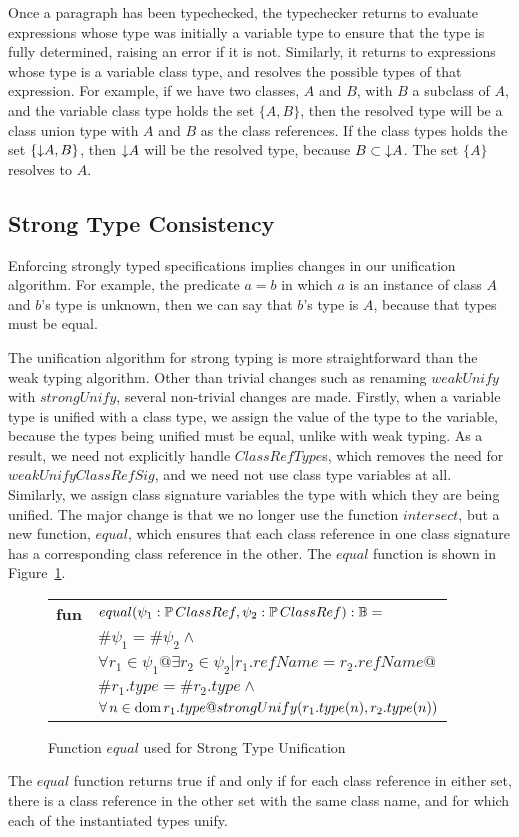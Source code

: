 Once a paragraph has been typechecked, the typechecker returns to
evaluate expressions whose type was initially a variable type to
ensure that the type is fully determined, raising an error if it is
not. Similarly, it returns to expressions whose type is a variable
class type, and resolves the possible types of that expression. For
example, if we have two classes, $A$ and $B$, with $B$ a subclass of
$A$, and the variable class type holds the set $\{A, B\}$, then the
resolved type will be a class union type with $A$ and $B$ as the class
references. If the class types holds the set $\{\mathord\downarrow A, B\}$, then
$\mathord\downarrow A$ will be the resolved type, because $B \subset \mathord\downarrow A$. The
set $\{A\}$ resolves to $A$.

\subsection{Strong Type Consistency}

Enforcing strongly typed specifications implies changes in our
unification algorithm.  For example, the predicate $a = b$ in which
$a$ is an instance of class $A$ and $b$'s type is unknown, then we can
say that $b$'s type is $A$, because that types must be equal.

The unification algorithm for strong typing is more straightforward
than the weak typing algorithm. Other than trivial changes such as
renaming $weakUnify$ with $strongUnify$, several non-trivial changes
are made. Firstly, when a variable type is unified with a class type,
we assign the value of the type to the variable, because the types
being unified must be equal, unlike with weak typing. As a result, we
need not explicitly handle $ClassRefType$s, which removes the need for
$weakUnifyClassRefSig$, and we need not use class type variables at
all. Similarly, we assign class signature variables the type with
which they are being unified. The major change is that we no longer
use the function $intersect$, but a new function, $equal$, which
ensures that each class reference in one class signature has a
corresponding class reference in the other. The $equal$ function is
shown in Figure~\ref{equal-classref}.

\begin{figure}[t]
\begin{tabular}{ll}
  {\bf fun} & $equal(\psi_1:\power ClassRef, \psi_2:\power ClassRef) : \bool =$\\
   & \quad\quad$\#\psi_1 = \#\psi_2 \land$\\
   & \quad\quad$\forall r_1 \in \psi_1 @ \exists r_2 \in \psi_2 | r_1.refName = r_2.refName @$\\
   & \quad\quad\quad\quad $\#r_1.type = \#r_2.type \land$\\
   & \quad\quad\quad\quad $\forall n \in \dom r_1.type @
       strongUnify(r_1.type(n), r_2.type(n))$
\end{tabular}
\caption{Function $equal$ used for Strong Type Unification}
\label{equal-classref}
\end{figure}

The $equal$ function returns true if and only if for each class
reference in either set, there is a class reference in the other set
with the same class name, and for which each of the instantiated types
unify.

